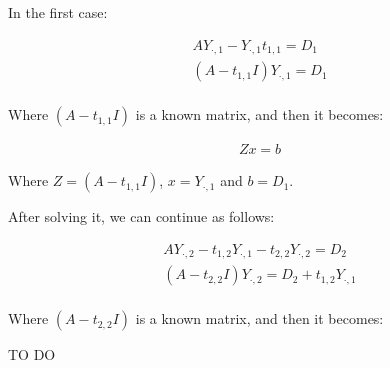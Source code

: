 \documentclass[]{article}
\begin{document}
In the first case:

\begin{gather}
AY_{\cdot,1}-Y_{\cdot,1}t_{1,1} = D_1\\
(A-t_{1,1}I)Y_{\cdot,1} = D_1\\
\end{gather}

Where $(A-t_{1,1}I)$ is a known matrix, and then it becomes:

\begin{gather}
Zx = b
\end{gather}

Where $Z = (A-t_{1,1}I)$, $x = Y_{\cdot,1}$ and $b=D_1$.

After solving it, we can continue as follows:

\begin{gather}
AY_{\cdot,2}-t_{1,2}Y_{\cdot,1} - t_{2,2}Y_{\cdot,2} = D_2\\
(A-t_{2,2}I)Y_{\cdot,2}  = D_2 +  t_{1,2}Y_{\cdot,1}\\
\end{gather}

Where $(A-t_{2,2}I)$ is a known matrix, and then it becomes:

TO DO
\newpage
\end{document}
